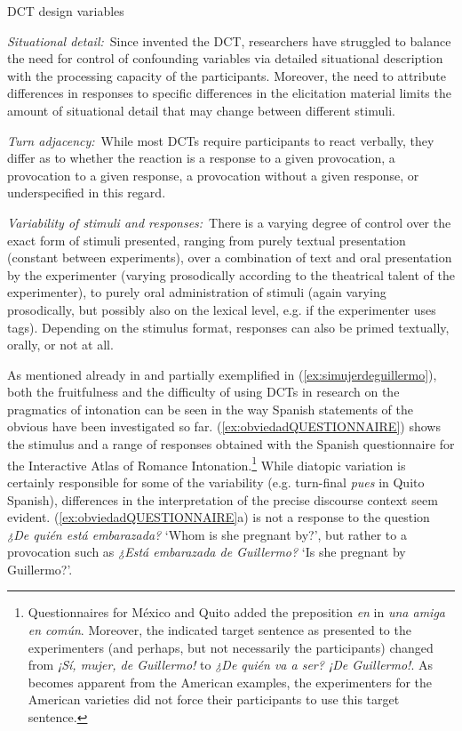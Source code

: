 \begin{exe}
	\ex \label{ex:DCTparameters}
	\ac{DCT} design variables
	\begin{xlist}
		\ex \textit{Situational detail:}~Since \citet{BlumKulka1989} invented the \ac{DCT}, researchers have struggled to balance the need for control of confounding variables via detailed situational description with the processing capacity of the participants. Moreover, the need to attribute differences in responses to specific differences in the elicitation material limits the amount of situational detail that may change between different stimuli.
		
		\ex \textit{Turn adjacency:}~While most \acp{DCT} require participants to react verbally, they differ as to whether the reaction is a response to a given provocation, a provocation to a given response, a provocation without a given response, or underspecified in this regard.
		
		\ex \textit{Variability of stimuli and responses:}~There is a varying degree of control over the exact form of stimuli presented, ranging from purely textual presentation (constant between experiments), over a combination of text and oral presentation by the experimenter (varying prosodically according to the theatrical talent of the experimenter), to purely oral administration of stimuli (again varying prosodically, but possibly also on the lexical level, e.g. if the experimenter uses tags). Depending on the stimulus format, responses can also be primed textually, orally, or not at all.
	\end{xlist}
\end{exe}

As mentioned already in  and partially exemplified in (\ref{ex:simujerdeguillermo}), both the fruitfulness and the difficulty of using \acp{DCT} in research on the pragmatics of intonation can be seen in the way Spanish statements of the obvious have been investigated so far. (\ref{ex:obviedadQUESTIONNAIRE}) shows the stimulus and a range of responses obtained with the Spanish questionnaire for the Interactive Atlas of Romance Intonation.\footnote{Questionnaires for México and Quito added the preposition \textit{en} in \textit{una amiga en común}. Moreover, the indicated target sentence as presented to the experimenters (and perhaps, but not necessarily the participants) changed from \textit{¡Sí, mujer, de Guillermo!} to \textit{¿De quién va a ser? ¡De Guillermo!}. As becomes apparent from the American examples, the experimenters for the American varieties did not force their participants to use this target sentence.} While diatopic variation is certainly responsible for some of the variability (e.g. turn-final \textit{pues} in Quito Spanish), differences in the interpretation of the precise discourse context seem evident. (\ref{ex:obviedadQUESTIONNAIRE}a) is not a response to the question \textit{¿De quién está embarazada?} `Whom is she pregnant by?', but rather to a provocation such as \textit{¿Está embarazada de Guillermo?} `Is she pregnant by Guillermo?'.


